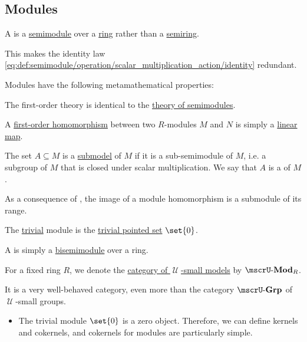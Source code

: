\subsection{Modules}\label{subsec:modules}

\begin{definition}\label{def:module}
  A  is a \hyperref[def:semimodule]{semimodule} over a \hyperref[def:ring]{ring} rather than a \hyperref[def:semiring]{semiring}.

  This makes the identity law \eqref{eq:def:semimodule/operation/scalar_multiplication_action/identity} redundant.

  Modules have the following metamathematical properties:
  \begin{thmenum}
     The first-order theory is identical to the \hyperref[def:semimodule/theory]{theory of semimodules}.

     A \hyperref[def:first_order_homomorphism]{first-order homomorphism} between two \( R \)-modules \( M \) and \( N \) is simply a \hyperref[def:semimodule/homomorphism]{linear map}.

     The set \( A \subseteq M \) is a \hyperref[thm:substructure_is_model]{submodel} of \( M \) if it is a sub-semimodule of \( M \), i.e. a subgroup of \( M \) that is closed under scalar multiplication. We say that \( A \) is a  of \( M \).

    As a consequence of , the image of a module homomorphism is a submodule of its range.

     The \hyperref[thm:substructures_form_complete_lattice/bottom]{trivial} module is the \hyperref[rem:pointed_set/trivial]{trivial pointed set} \( \set{ 0 } \).

     A  is simply a \hyperref[def:semimodule/bisemimodule]{bisemimodule} over a ring.

     For a fixed ring \( R \), we denote the \hyperref[def:category_of_small_first_order_models]{category of \( \mscrU \)-small models} by \( \ucat{Mod}_R \).

    It is a very well-behaved category, even more than the category \hyperref[def:group/category]{\( \ucat{Grp} \)} of \( \mscrU \)-small groups.
    \begin{itemize}
      \item The trivial module \( \set{ 0 } \) is a zero object. Therefore, we can define kernels and cokernels, and cokernels for modules are particularly simple.


\end{itemize}
\end{thmenum}
\end{definition}
